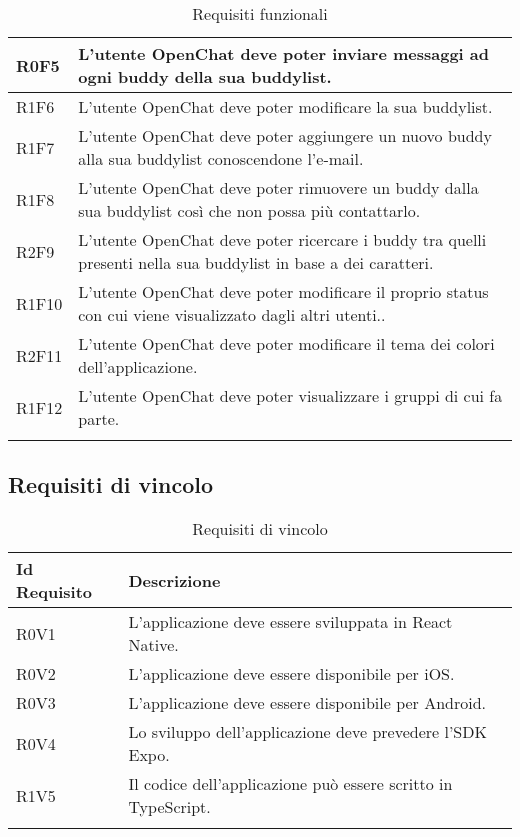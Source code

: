 \begin{longtable}{|C{3cm}| C{10cm}|}
	R0F5 & L'utente OpenChat deve poter inviare messaggi ad ogni buddy della sua buddylist.\\ \hline 
	R1F6 & L'utente OpenChat deve poter modificare la sua buddylist.\\ \hline 
	R1F7 & L'utente OpenChat deve poter aggiungere un nuovo buddy alla sua buddylist conoscendone l'e-mail.\\ \hline 
	R1F8 & L'utente OpenChat deve poter rimuovere un buddy dalla sua buddylist così che non possa più contattarlo.\\ \hline 
	R2F9 & L'utente OpenChat deve poter ricercare i buddy tra quelli presenti nella sua buddylist in base a dei caratteri.\\ \hline 
	R1F10 & L'utente OpenChat deve poter modificare il proprio status con cui viene visualizzato dagli altri utenti..\\ \hline 
	R2F11 & L'utente OpenChat deve poter modificare il tema dei colori dell'applicazione.\\ \hline 
	R1F12 & L'utente OpenChat deve poter visualizzare i gruppi di cui fa parte.\\ \hline 
	
	\caption{Requisiti funzionali}
	\label{tabella:req}
\end{longtable}

\subsection{Requisiti di vincolo}
\begin{longtable}{|C{3cm}|C{10cm}|}
	\hline
	\textbf{Id Requisito} & \textbf{Descrizione}\\
	\hline
	\endhead
	R0V1 & L'applicazione deve essere sviluppata in React Native. \\ \hline 
	R0V2 & L'applicazione deve essere disponibile per iOS.  \\ \hline 
	R0V3 & L'applicazione deve essere disponibile per Android.  \\ \hline 
	R0V4 & Lo sviluppo dell'applicazione deve prevedere l'SDK Expo. \\ \hline 
	R1V5 & Il codice dell'applicazione può essere scritto in TypeScript.  \\ \hline 
	\caption{Requisiti di vincolo}
	\label{tabella:reqV}
\end{longtable}

